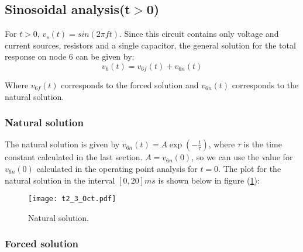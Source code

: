\newpage

\subsection{Sinosoidal analysis(t$>$0)}

For $t>0$, $v_{s}\left(t\right)=sin\left(2\pi ft\right)$.
Since this circuit contains only voltage and current sources, resistors and a single capacitor, the general solution for the total response on node 6 can be given by:
\begin{equation}
  v_{6}\left(t\right)=v_{6f}\left(t\right)+v_{6n}\left(t\right)
\end{equation}

Where $v_{6f}\left(t\right)$ corresponds to the forced 
solution and $v_{6n}\left(t\right)$ corresponds to the natural solution.

\subsubsection{Natural solution}

The natural solution is given by $v_{6n}\left(t\right)=A\exp(-\frac{t}{\tau})$,
 where $\tau$ is the time constant calculated in the last section. 
 $A=v_{6n}\left(0\right)$, so we can use the value for $v_{6n}\left(0\right)$
  calculated in the operating point analysis for $t=0$. 
  The plot for the natural solution in the interval $\left[0,20\right] ms$ 
  is shown below in figure (\ref{fig:t2_3_Oct}):

\begin{figure}[h] \centering
  \texttt{[image: t2\_3\_Oct.pdf]}
  \caption{Natural solution.}
  \label{fig:t2_3_Oct}
\end{figure}

\newpage

\subsubsection{Forced solution}

